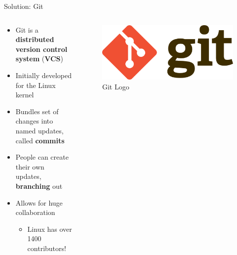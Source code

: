 \documentclass[compress,aspectratio=169]{beamer}
\begin{document}
  \begin{frame}{Solution: Git}
    \begin{columns}
      \begin{column}{0.5\textwidth}
        \begin{itemize}
          \item Git is a \textbf{distributed version control system} (\textbf{VCS})
          \item Initially developed for the Linux kernel
          \item Bundles set of changes into named updates, called \textbf{commits}
          \item People can create their own updates, \textbf{branching} out
          \item Allows for huge collaboration
            \begin{itemize}
              \item Linux has over 1400 contributors! \cite{contrib}
            \end{itemize}
        \end{itemize}
      \end{column}
      \begin{column}{0.5\textwidth}
        \begin{figure}
          \includegraphics[width=\textwidth]{./assets/Git.png}
          \caption{Git Logo \cite{git}}
        \end{figure}
      \end{column}
    \end{columns}
  \end{frame}
\end{document}
